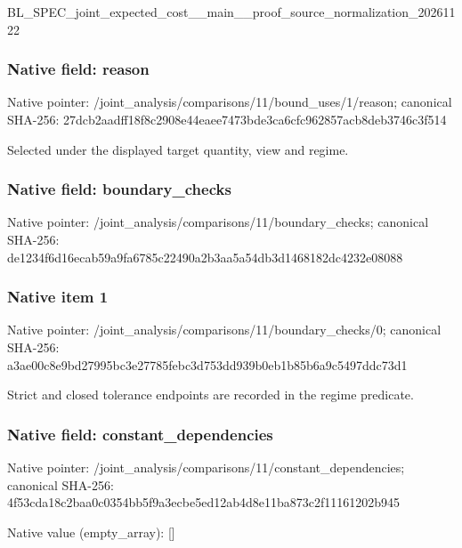 \documentclass[10pt,a4paper]{article}
\begin{document}
BL\_SPEC\_joint\_expected\_c\allowbreak{}ost\_\_main\_\_proof\_source\_\allowbreak{}normalization\_20261122


\subsubsection{Native field: reason}


Native pointer: /joint\_analysis/comparis\allowbreak{}ons/11/bound\_uses/1/reas\allowbreak{}on; canonical SHA-256: 27dcb2aadff18f8c2908e44e\allowbreak{}aee7473bde3ca6cfc962857a\allowbreak{}cb8deb3746c3f514


Selected under the displayed target quantity, view and regime.


\subsubsection{Native field: boundary\_checks}


Native pointer: /joint\_analysis/comparis\allowbreak{}ons/11/boundary\_checks; canonical SHA-256: de1234f6d16ecab59a9fa678\allowbreak{}5c22490a2b3aa5a54db3d146\allowbreak{}8182dc4232e08088



\subsubsection{Native item 1}


Native pointer: /joint\_analysis/comparis\allowbreak{}ons/11/boundary\_checks/0; canonical SHA-256: a3ae00c8e9bd27995bc3e277\allowbreak{}85febc3d753dd939b0eb1b85\allowbreak{}b6a9c5497ddc73d1


Strict and closed tolerance endpoints are recorded in the regime predicate.


\subsubsection{Native field: constant\_dependencies}


Native pointer: /joint\_analysis/comparis\allowbreak{}ons/11/constant\_dependen\allowbreak{}cies; canonical SHA-256: 4f53cda18c2baa0c0354bb5f\allowbreak{}9a3ecbe5ed12ab4d8e11ba87\allowbreak{}3c2f11161202b945



Native value (empty\_array): []
\end{document}
